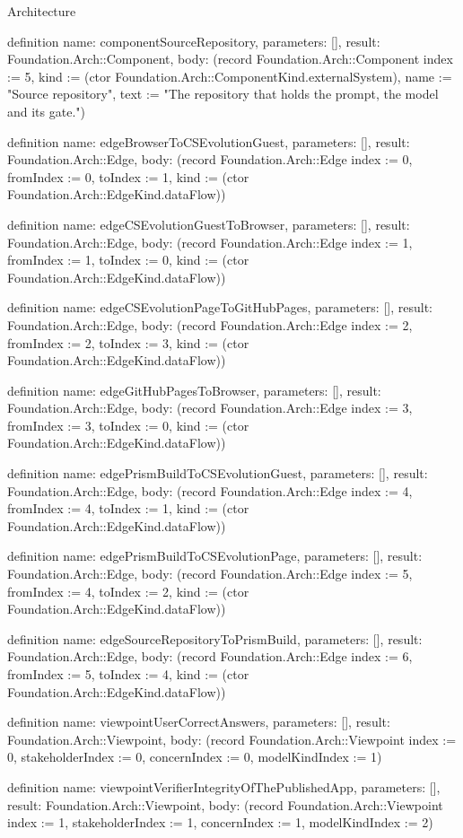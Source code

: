 \begin{lexlean}{Architecture}
\begin{semanticmodule}
definition{
  name: componentSourceRepository,
  parameters: [],
  result: Foundation.Arch::Component,
  body: (record Foundation.Arch::Component {index := 5, kind := (ctor Foundation.Arch::ComponentKind.externalSystem), name := "Source repository", text := "The repository that holds the prompt, the model and its gate."})
}

definition{
  name: edgeBrowserToCSEvolutionGuest,
  parameters: [],
  result: Foundation.Arch::Edge,
  body: (record Foundation.Arch::Edge {index := 0, fromIndex := 0, toIndex := 1, kind := (ctor Foundation.Arch::EdgeKind.dataFlow)})
}

definition{
  name: edgeCSEvolutionGuestToBrowser,
  parameters: [],
  result: Foundation.Arch::Edge,
  body: (record Foundation.Arch::Edge {index := 1, fromIndex := 1, toIndex := 0, kind := (ctor Foundation.Arch::EdgeKind.dataFlow)})
}

definition{
  name: edgeCSEvolutionPageToGitHubPages,
  parameters: [],
  result: Foundation.Arch::Edge,
  body: (record Foundation.Arch::Edge {index := 2, fromIndex := 2, toIndex := 3, kind := (ctor Foundation.Arch::EdgeKind.dataFlow)})
}

definition{
  name: edgeGitHubPagesToBrowser,
  parameters: [],
  result: Foundation.Arch::Edge,
  body: (record Foundation.Arch::Edge {index := 3, fromIndex := 3, toIndex := 0, kind := (ctor Foundation.Arch::EdgeKind.dataFlow)})
}

definition{
  name: edgePrismBuildToCSEvolutionGuest,
  parameters: [],
  result: Foundation.Arch::Edge,
  body: (record Foundation.Arch::Edge {index := 4, fromIndex := 4, toIndex := 1, kind := (ctor Foundation.Arch::EdgeKind.dataFlow)})
}

definition{
  name: edgePrismBuildToCSEvolutionPage,
  parameters: [],
  result: Foundation.Arch::Edge,
  body: (record Foundation.Arch::Edge {index := 5, fromIndex := 4, toIndex := 2, kind := (ctor Foundation.Arch::EdgeKind.dataFlow)})
}

definition{
  name: edgeSourceRepositoryToPrismBuild,
  parameters: [],
  result: Foundation.Arch::Edge,
  body: (record Foundation.Arch::Edge {index := 6, fromIndex := 5, toIndex := 4, kind := (ctor Foundation.Arch::EdgeKind.dataFlow)})
}

definition{
  name: viewpointUserCorrectAnswers,
  parameters: [],
  result: Foundation.Arch::Viewpoint,
  body: (record Foundation.Arch::Viewpoint {index := 0, stakeholderIndex := 0, concernIndex := 0, modelKindIndex := 1})
}

definition{
  name: viewpointVerifierIntegrityOfThePublishedApp,
  parameters: [],
  result: Foundation.Arch::Viewpoint,
  body: (record Foundation.Arch::Viewpoint {index := 1, stakeholderIndex := 1, concernIndex := 1, modelKindIndex := 2})
}


\end{semanticmodule}
\end{lexlean}
